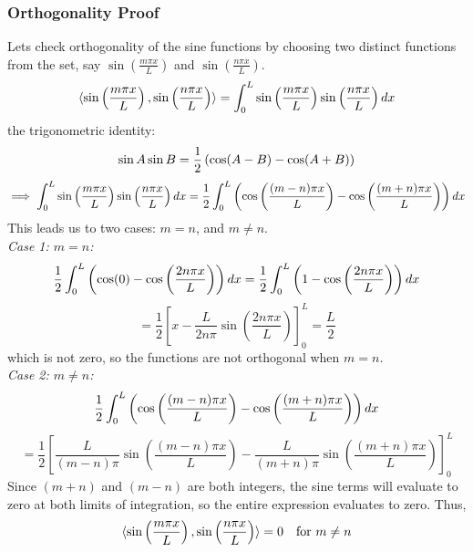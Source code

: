\subsubsection{Orthogonality Proof}\label{subsubsec.ortho_proof}
Lets check orthogonality of the sine functions by choosing two distinct functions from the set, say $\sin\left(\frac{m \pi x}{L}\right)$ and $\sin\left(\frac{n \pi x}{L}\right)$.
\[
\langle \sin \left( \frac{m \pi x}{L} \right), \sin \left( \frac{n \pi x}{L} \right) \rangle = \int_0^L \sin \left( \frac{m \pi x}{L} \right) \sin \left( \frac{n \pi x}{L} \right) dx
\]
\recall the trigonometric identity:
\[
\sin A \sin B = \frac{1}{2} \left( \cos(A-B) - \cos(A+B) \right)
\]
\[
\implies \int_0^L \sin \left( \frac{m \pi x}{L} \right) \sin \left( \frac{n \pi x}{L} \right) dx = \frac{1}{2} \int_0^L \left( \cos\left(\frac{(m-n) \pi x}{L}\right) - \cos\left(\frac{(m+n) \pi x}{L}\right) \right) dx
\]
This leads us to two cases: $m =n$, and $m \neq n$.\\
\textit{Case 1: $m = n$:}
\[
\frac{1}{2} \int_0^L \left( \cos(0) - \cos\left(\frac{2n \pi x}{L}\right) \right) dx = \frac{1}{2} \int_0^L \left( 1 - \cos\left(\frac{2n \pi x}{L}\right) \right) dx
\]
\[
= \frac{1}{2} \left[ x - \frac{L}{2n \pi} \sin\left(\frac{2n \pi x}{L}\right) \right]_0^L = \frac{L}{2}
\]
which is not zero, so the functions are not orthogonal when $m = n$.\\
\textit{Case 2: $m \neq n$:}
\[
\frac{1}{2} \int_0^L \left( \cos\left(\frac{(m-n) \pi x}{L}\right) - \cos\left(\frac{(m+n) \pi x}{L}\right) \right) dx
\]
\[
= \frac{1}{2} \left[ \frac{L}{(m-n) \pi} \sin\left(\frac{(m-n) \pi x}{L}\right) - \frac{L}{(m+n) \pi} \sin\left(\frac{(m+n) \pi x}{L}\right) \right]_0^L 
\]
Since $(m+n)$ and $(m-n)$ are both integers, the sine terms will evaluate to zero at both limits of integration, so the entire expression evaluates to zero. Thus,
\[
\langle \sin \left( \frac{m \pi x}{L} \right), \sin \left( \frac{n \pi x}{L} \right) \rangle = 0 \quad \text{for } m \neq n
\]

